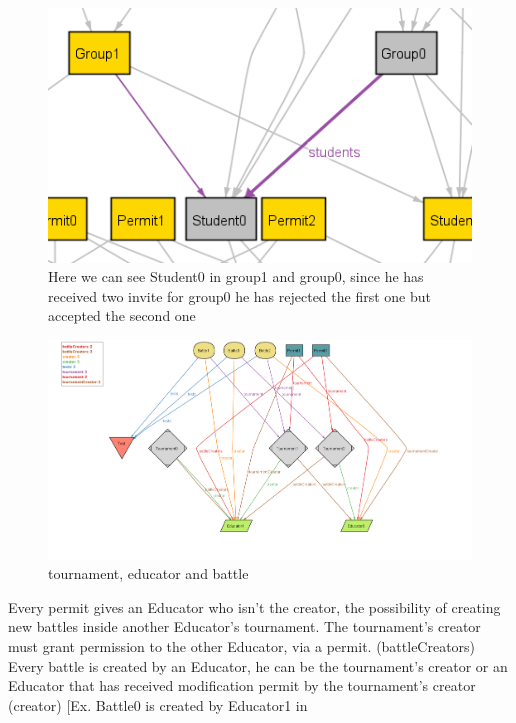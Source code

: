 \documentclass{article}
\begin{document}
{\begin{figure}[H]
    \centering
    \includegraphics{images/ALLOY/students.png}
    \caption{Here we can see Student0 in group1 and group0, since he has received two invite for group0 he has rejected the first one but accepted the second one}
    \label{fig:receivingAcceptingRefusingInvite}
\end{figure}
\begin{figure}[H]
    \centering
    \hspace*{-4cm}\includegraphics[scale=0.62]{images/ALLOY/AlloyTournament.png}
    \caption{tournament, educator and battle}
    \label{fig:tournament, Educator and battle}
\end{figure}
\color{red}
Every permit gives an Educator who isn't the creator, the possibility of creating new battles inside another Educator's tournament.
The tournament's creator must grant permission to the other Educator, via a permit. (battleCreators)\\
\color{orange}
Every battle is created by an Educator, he can be the tournament's creator or an Educator that has received 
modification permit by the tournament's creator (creator) [Ex. Battle0 is created by Educator1 in 
}
\end{document}
